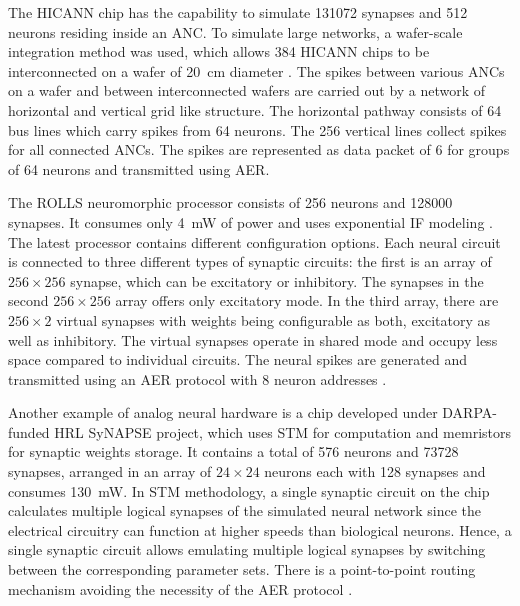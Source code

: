 The \ac{HICANN} chip \cite{Schemmel2008} has the capability to simulate \num{131072} synapses and \num{512} neurons residing inside an \ac{ANC}.
To simulate large networks, a wafer-scale integration method was used, which allows \num{384} \ac{HICANN} chips to be interconnected on a wafer of \SI{20}{\centi\meter} diameter \cite{Schemmel2010}.
The spikes between various \acp{ANC} on a wafer and between interconnected wafers are carried out by a network of horizontal and vertical grid like structure.
The horizontal pathway consists of \num{64} bus lines which carry spikes from \num{64} neurons.
The \num{256} vertical lines collect spikes for all connected \acp{ANC}.
The spikes are represented as data packet of \SI{6}{\bit} for groups of \num{64} neurons and transmitted using \ac{AER}. 

The \ac{ROLLS} neuromorphic processor consists of \num{256} neurons and \num{128000} synapses.
It consumes only \SI{4}{\milli\watt} of power and uses exponential \ac{IF} modeling \cite{Qiao2015}.
The latest processor contains different configuration options.
Each neural circuit is connected to three different types of synaptic circuits: the first is an array of $256\times256$ synapse, which can be excitatory or inhibitory.
The synapses in the second $256\times256$ array offers only excitatory mode.
In the third array, there are $256\times2$ virtual synapses with weights being configurable as both, excitatory as well as inhibitory.
The virtual synapses operate in shared mode and occupy less space compared to individual circuits.
The neural spikes are generated and transmitted using an \ac{AER} protocol with \SI{8}{\bit} neuron addresses \cite{Qiao2015}.

Another example of analog neural hardware is a chip \cite{Srinivasa2012} developed under \ac{DARPA}-funded \ac{HRL} \ac{SyNAPSE} project, which uses \ac{STM} for computation and memristors for synaptic weights storage.
It contains a total of \num{576} neurons and \num{73728} synapses, arranged in an array of $24\times24$ neurons each with \num{128} synapses and consumes \SI{130}{\milli\watt}.
In \ac{STM} methodology, a single synaptic circuit on the chip calculates multiple logical synapses of the simulated neural network since the electrical circuitry can function at higher speeds than biological neurons.
Hence, a single synaptic circuit allows emulating multiple logical synapses by switching between the corresponding parameter sets.
There is a point-to-point routing mechanism avoiding the necessity of the \ac{AER} protocol \cite{Walter2015}. 

